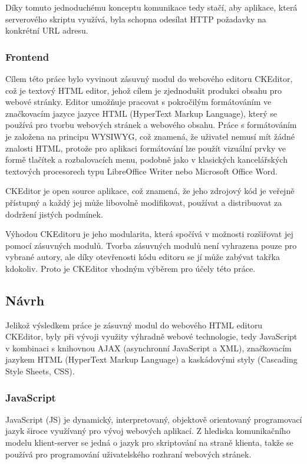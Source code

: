 \documentclass[a4paper,11pt]{article}
\begin{document}
Díky tomuto jednoduchému konceptu komunikace tedy stačí, aby aplikace, která serverového skriptu využívá, byla schopna odesílat HTTP požadavky na konkrétní URL adresu. 

\subsubsection{Frontend}

Cílem této práce bylo vyvinout zásuvný modul do webového editoru CKEditor, což je textový HTML editor, jehož cílem je zjednodušit produkci obsahu pro webové stránky. Editor umožňuje pracovat s pokročilým formátováním ve značkovacím jazyce jazyce HTML (HyperText Markup Language), který se používá pro tvorbu webových stránek a webového obsahu. Práce s formátováním je založena na principu WYSIWYG, což znamená, že uživatel nemusí mít žádné znalosti HTML, protože pro aplikaci formátování lze použít vizuální prvky ve formě tlačítek a rozbalovacích menu, podobně jako v klasických kancelářských textových procesorech typu LibreOffice Writer nebo Microsoft Office Word.

CKEditor je open source aplikace, což znamená, že jeho zdrojový kód je veřejně přístupný a každý jej může libovolně modifikovat, používat a distribuovat za dodržení jistých podmínek. 

Výhodou CKEditoru je jeho modularita, která spočívá v možnosti rozšiřovat jej pomocí zásuvných modulů. Tvorba zásuvných modulů není vyhrazena pouze pro vybrané autory, ale  díky otevřenosti kódu editoru se jí může zabývat takřka kdokoliv. Proto je CKEditor vhodným výběrem pro účely této práce. %

\subsection{Návrh}

Jelikož výsledkem práce je zásuvný modul do webového HTML editoru CKEditor, byly při vývoji využity výhradně webové technologie, tedy JavaScript v kombinaci s knihovnou AJAX (asynchronní JavaScript a XML), značkovacím jazykem HTML (HyperText Markup Language) a kaskádovými styly (Cascading Style Sheets, CSS). 

\subsubsection{JavaScript}

JavaScript (JS) je dynamický, interpretovaný, objektově orientovaný programovací jazyk široce využívaný pro vývoj webových aplikací. Z hlediska komunikačního modelu klient-server se jedná o jazyk pro skriptování na straně klienta, takže se používá pro programování uživatelského rozhraní webových stránek. %
\end{document}
